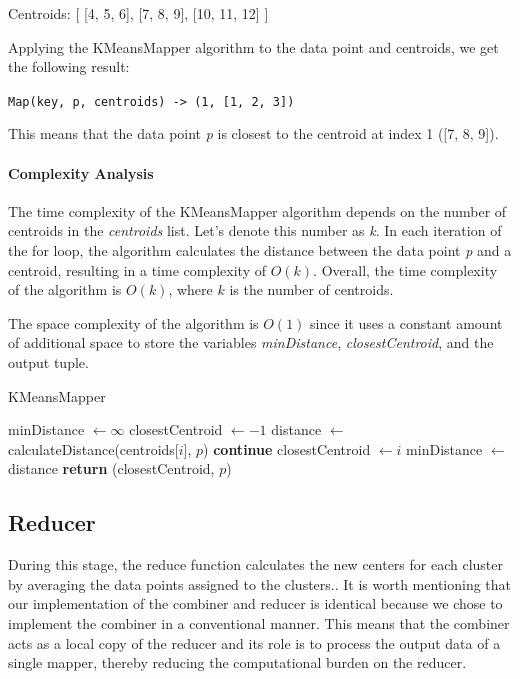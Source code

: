 \documentclass[parskip=full]{report}
\begin{document}
Centroids: [ [4, 5, 6], [7, 8, 9], [10, 11, 12] ]

Applying the KMeansMapper algorithm to the data point and centroids, we get the following result:

\texttt{Map(key, p, centroids) -> (1, [1, 2, 3])}

This means that the data point \textit{p} is closest to the centroid at index 1 ([7, 8, 9]).

\paragraph{Complexity Analysis}
The time complexity of the KMeansMapper algorithm depends on the number of centroids in the \textit{centroids} list. Let's denote this number as \textit{k}. In each iteration of the for loop, the algorithm calculates the distance between the data point \textit{p} and a centroid, resulting in a time complexity of \(O(k)\). Overall, the time complexity of the algorithm is \(O(k)\), where \(k\) is the number of centroids.

The space complexity of the algorithm is \(O(1)\) since it uses a constant amount of additional space to store the variables \textit{minDistance}, \textit{closestCentroid}, and the output tuple.


	\begin{algorithm}
		\caption{KMeansMapper}
		\begin{algorithmic}[1]


			\State minDistance $\gets \infty$
			\State closestCentroid $\gets -1$
			\State distance $\gets$ calculateDistance(centroids[$i$], $p$)
			\State \textbf{continue}
			\EndIf
			\State closestCentroid $\gets i$
			\State minDistance $\gets$ distance
			\EndFor
			\State \textbf{return} (closestCentroid, $p$)

			\EndProcedure
		\end{algorithmic}
	\end{algorithm}


\subsection{Reducer}

During this stage, the reduce function calculates the new centers for each cluster by averaging the data points assigned to the clusters.. It is worth mentioning that our implementation of the combiner and reducer is identical because we chose to implement the combiner in a conventional manner. This means that the combiner acts as a local copy of the reducer and its role is to process the output data of a single mapper, thereby reducing the computational burden on the reducer.
\end{document}
